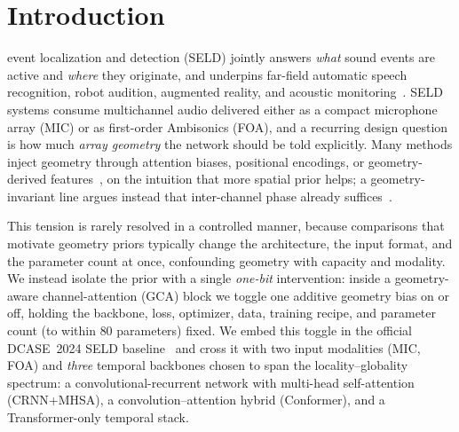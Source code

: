 \section{Introduction}
\label{sec:intro}

 event localization and detection (SELD) jointly answers
\emph{what} sound events are active and \emph{where} they originate, and
underpins far-field automatic speech recognition, robot audition, augmented
reality, and acoustic monitoring~\cite{adavanne2018seld,politis2020overview}.
SELD systems consume multichannel audio delivered either as a compact microphone
array (MIC) or as first-order Ambisonics (FOA), and a recurring design question
is how much \emph{array geometry} the network should be told explicitly. Many
methods inject geometry through attention biases, positional encodings, or
geometry-derived features~\cite{kowalk2022geometry}, on the intuition
that more spatial prior helps; a geometry-invariant line argues instead
that inter-channel phase already suffices~\cite{baek2025gidoaenet,neuralsrp2024}.

This tension is rarely resolved in a controlled manner, because comparisons that
motivate geometry priors typically change the architecture, the input format,
and the parameter count at once, confounding geometry with capacity and
modality. We instead isolate the prior with a single \emph{one-bit} intervention:
inside a geometry-aware channel-attention (GCA) block we toggle one additive
geometry bias on or off, holding the backbone, loss, optimizer, data, training
recipe, and parameter count (to within $80$ parameters) fixed. We embed this
toggle in the official DCASE~2024 SELD baseline~\cite{krause2024sde} and cross it
with two input modalities (MIC, FOA) and \emph{three} temporal backbones chosen
to span the locality--globality spectrum: a convolutional-recurrent network with
multi-head self-attention (CRNN+MHSA), a convolution--attention hybrid
(Conformer), and a Transformer-only temporal stack.


